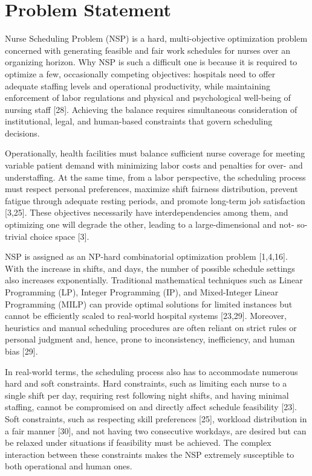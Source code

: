 \documentclass[10pt,a4paper,twocolumn]{article}
\begin{document}
\section{Problem Statement}

Nurse Scheduling Problem (NSP) is a hard, multi-objective optimization problem concerned
with generating feasible and fair work schedules for nurses over an organizing horizon. Why
NSP is such a difficult one is because it is required to optimize a few, occasionally competing
objectives: hospitals need to offer adequate staffing levels and operational productivity, while
maintaining enforcement of labor regulations and physical and psychological well-being of
nursing staff [28]. Achieving the balance requires simultaneous consideration of institutional,
legal, and human-based constraints that govern scheduling decisions.

Operationally, health facilities must balance sufficient nurse coverage for meeting variable
patient demand with minimizing labor costs and penalties for over- and understaffing. At the
same time, from a labor perspective, the scheduling process must respect personal preferences,
maximize shift fairness distribution, prevent fatigue through adequate resting periods, and
promote long-term job satisfaction [3,25]. These objectives necessarily have interdependencies
among them, and optimizing one will degrade the other, leading to a large-dimensional and not-
so-trivial choice space [3].

NSP is assigned as an NP-hard combinatorial optimization problem [1,4,16]. With the increase
in shifts, and days, the number of possible schedule settings also increases exponentially.
Traditional mathematical techniques such as Linear Programming (LP), Integer Programming
(IP), and Mixed-Integer Linear Programming (MILP) can provide optimal solutions for limited
instances but cannot be efficiently scaled to real-world hospital systems [23,29]. Moreover,
heuristics and manual scheduling procedures are often reliant on strict rules or personal judgment
and, hence, prone to inconsistency, inefficiency, and human bias [29].

In real-world terms, the scheduling process also has to accommodate numerous hard and soft
constraints. Hard constraints, such as limiting each nurse to a single shift per day, requiring rest
following night shifts, and having minimal staffing, cannot be compromised on and directly
affect schedule feasibility [23]. Soft constraints, such as respecting skill preferences [25],
workload distribution in a fair manner [30], and not having two consecutive workdays, are
desired but can be relaxed under situations if feasibility must be achieved. The complex
interaction between these constraints makes the NSP extremely susceptible to both operational
and human ones.
\end{document}
